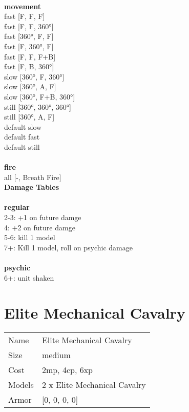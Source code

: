 \ \\ {\bf movement } \\
fast [F, F, F] \\
fast [F, F, 360°] \\
fast [360°, F, F] \\
fast [F, 360°, F] \\
fast [F, F, F+B] \\
fast [F, B, 360°] \\
slow [360°, F, 360°] \\
slow [360°, A, F] \\
slow [360°, F+B, 360°] \\
still [360°, 360°, 360°] \\
still [360°, A, F] \\
default slow \\
default fast \\
default still \\
\ \\ {\bf fire } \\
all [-, Breath Fire] \\


{\bf Damage Tables} \\
\ \\ {\bf regular } \\
2-3: +1 on future damge \\
4: +2 on future damge \\
5-6: kill 1 model \\
7+: Kill 1 model, roll on psychic damage \\
\ \\ {\bf psychic } \\
6+: unit shaken \\










\pagebreak\pagebreak

\section{ Elite Mechanical Cavalry }

\begin{tabular}{ll}
  Name & Elite Mechanical Cavalry \\
  Size & medium\\
  Cost & 2mp, 4cp, 6xp\\
  Models & 2 x Elite Mechanical Cavalry\\
  Armor & [0, 0, 0, 0]\\
\end{tabular}

